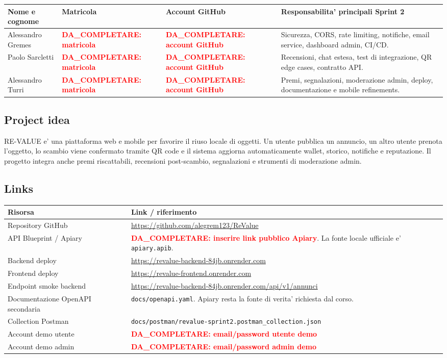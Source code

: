 \documentclass[11pt,a4paper]{article}
\newcommand{\todo}[1]{\textcolor{red}{\textbf{DA\_COMPLETARE: #1}}}
\newcommand{\code}[1]{\texttt{#1}}
\begin{document}
\begin{longtable}{L{3.4cm} L{3cm} L{4.2cm} L{4.2cm}}
\toprule
\textbf{Nome e cognome} & \textbf{Matricola} & \textbf{Account GitHub} & \textbf{Responsabilita' principali Sprint 2} \\
\midrule
Alessandro Gremes & \todo{matricola} & \todo{account GitHub} &
Sicurezza, CORS, rate limiting, notifiche, email service, dashboard admin, CI/CD. \\
\midrule
Paolo Sarcletti & \todo{matricola} & \todo{account GitHub} &
Recensioni, chat estesa, test di integrazione, QR edge cases, contratto API. \\
\midrule
Alessandro Turri & \todo{matricola} & \todo{account GitHub} &
Premi, segnalazioni, moderazione admin, deploy, documentazione e mobile refinements. \\
\bottomrule
\end{longtable}

\subsection{Project idea}

RE-VALUE e' una piattaforma web e mobile per favorire il riuso locale di oggetti.
Un utente pubblica un annuncio, un altro utente prenota l'oggetto, lo scambio
viene confermato tramite QR code e il sistema aggiorna automaticamente wallet,
storico, notifiche e reputazione. Il progetto integra anche premi riscattabili,
recensioni post-scambio, segnalazioni e strumenti di moderazione admin.

\subsection{Links}

\begin{longtable}{L{4cm} L{11cm}}
\toprule
\textbf{Risorsa} & \textbf{Link / riferimento} \\
\midrule
Repository GitHub & \url{https://github.com/alegrem123/ReValue} \\
\midrule
API Blueprint / Apiary & \todo{inserire link pubblico Apiary}. La fonte locale ufficiale e' \code{apiary.apib}. \\
\midrule
Backend deploy & \url{https://revalue-backend-84jb.onrender.com} \\
\midrule
Frontend deploy & \url{https://revalue-frontend.onrender.com} \\
\midrule
Endpoint smoke backend & \url{https://revalue-backend-84jb.onrender.com/api/v1/annunci} \\
\midrule
Documentazione OpenAPI secondaria & \code{docs/openapi.yaml}. Apiary resta la fonte di verita' richiesta dal corso. \\
\midrule
Collection Postman & \code{docs/postman/revalue-sprint2.postman\_collection.json} \\
\midrule
Account demo utente & \todo{email/password utente demo} \\
\midrule
Account demo admin & \todo{email/password admin demo} \\
\bottomrule
\end{longtable}
\end{document}
